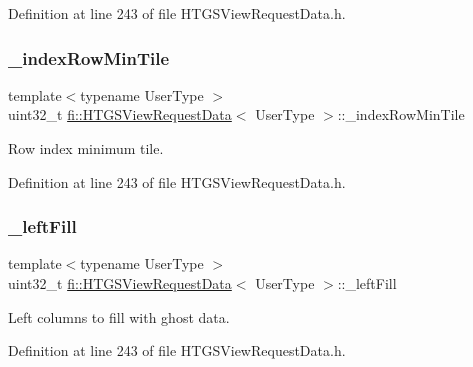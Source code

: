 Definition at line 243 of file H\+T\+G\+S\+View\+Request\+Data.\+h.

\mbox{\label{classfi_1_1HTGSViewRequestData_a2db3bda31418dc59cdf81a23f4cba188}} 
\subsubsection{\texorpdfstring{\+\_\+index\+Row\+Min\+Tile}{\_indexRowMinTile}}
{\footnotesize\ttfamily template$<$typename User\+Type $>$ \\
uint32\+\_\+t \hyperlink{classfi_1_1HTGSViewRequestData}{fi\+::\+H\+T\+G\+S\+View\+Request\+Data}$<$ User\+Type $>$\+::\+\_\+index\+Row\+Min\+Tile\hspace{0.3cm}{\ttfamily [private]}}



Row index minimum tile. 



Definition at line 243 of file H\+T\+G\+S\+View\+Request\+Data.\+h.

\mbox{\label{classfi_1_1HTGSViewRequestData_a64abbf3a786abe66e4cd8c05887031ab}} 
\subsubsection{\texorpdfstring{\+\_\+left\+Fill}{\_leftFill}}
{\footnotesize\ttfamily template$<$typename User\+Type $>$ \\
uint32\+\_\+t \hyperlink{classfi_1_1HTGSViewRequestData}{fi\+::\+H\+T\+G\+S\+View\+Request\+Data}$<$ User\+Type $>$\+::\+\_\+left\+Fill\hspace{0.3cm}{\ttfamily [private]}}



Left columns to fill with ghost data. 



Definition at line 243 of file H\+T\+G\+S\+View\+Request\+Data.\+h.

